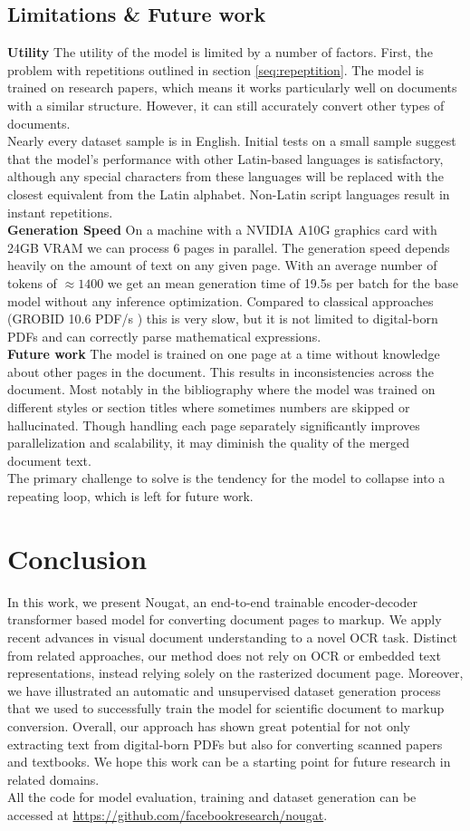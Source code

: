 \documentclass[]{article}
\newcommand{\para}[1]{\textbf{#1} \quad}
\begin{document}
\subsection{Limitations \& Future work}
\para{Utility}
The utility of the model is limited by a number of factors. First, the problem with repetitions outlined in section \ref{seq:repeptition}. 
The model is trained on research papers, which means it works particularly well on documents with a similar structure. However, it can still accurately convert other types of documents. \\
Nearly every dataset sample is in English. Initial tests on a small sample suggest that the model's performance with other Latin-based languages is satisfactory, although any special characters from these languages will be replaced with the closest equivalent from the Latin alphabet. Non-Latin script languages result in instant repetitions.
\\\para{Generation Speed}
On a machine with a NVIDIA A10G graphics card with 24GB VRAM we can process 6 pages in parallel. The generation speed depends heavily on the amount of text on any given page. With an average number of tokens of $\approx 1400$ %
we get an mean generation time of 19.5s per batch for the base model without any inference optimization. Compared to classical approaches (GROBID 10.6 PDF/s \cite{lopez_grobid_2023}) this is very slow, but it is not limited to digital-born PDFs and can correctly parse mathematical expressions. 
\\\para{Future work}
The model is trained on one page at a time without knowledge about other pages in the document. This results in inconsistencies across the document. Most notably in the bibliography where the model was trained on different styles or section titles where sometimes numbers are skipped or hallucinated. Though handling each page separately significantly improves parallelization and scalability, it may diminish the quality of the merged document text.
\\The primary challenge to solve is the tendency for the model to collapse into a repeating loop, which is left for future work.

\section{Conclusion}
In this work, we present Nougat, an end-to-end trainable encoder-decoder transformer based model for converting document pages to markup. We apply recent advances in visual document understanding to a novel OCR task. Distinct from related approaches, our method does not rely on OCR or embedded text representations, instead relying solely on the rasterized document page. 
Moreover, we have illustrated an automatic and unsupervised dataset generation process that we used to successfully train the model for scientific document to markup conversion. Overall, our approach has shown great potential for not only extracting text from digital-born PDFs but also for converting scanned papers and textbooks. We hope this work can be a starting point for future research in related domains.
\\All the code for model evaluation, training and dataset generation can be accessed at \url{https://github.com/facebookresearch/nougat}.
\end{document}
